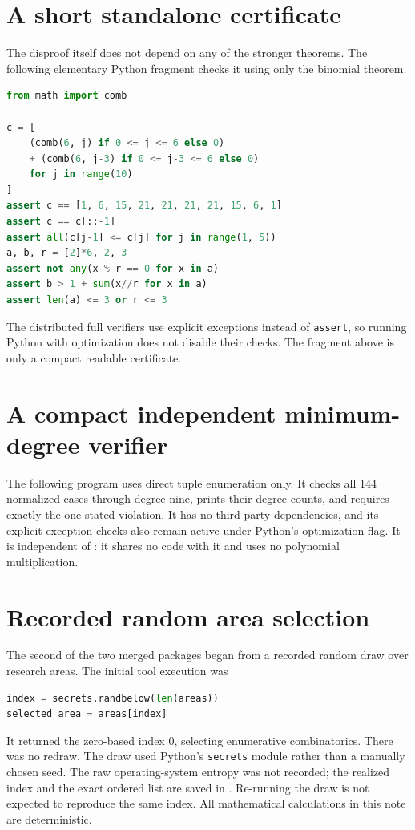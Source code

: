 \documentclass[11pt]{article}
\theoremstyle{research}
\theoremstyle{definition}
\numberwithin{equation}{section}
\begin{document}
\section{A short standalone certificate}
\label{app:short-certificate}
The disproof itself does not depend on any of the stronger theorems.
The following elementary Python fragment checks it using only the
binomial theorem.
\begin{lstlisting}[language=Python]
from math import comb

c = [
    (comb(6, j) if 0 <= j <= 6 else 0)
    + (comb(6, j-3) if 0 <= j-3 <= 6 else 0)
    for j in range(10)
]
assert c == [1, 6, 15, 21, 21, 21, 21, 15, 6, 1]
assert c == c[::-1]
assert all(c[j-1] <= c[j] for j in range(1, 5))
a, b, r = [2]*6, 2, 3
assert not any(x % r == 0 for x in a)
assert b > 1 + sum(x//r for x in a)
assert len(a) <= 3 or r <= 3
\end{lstlisting}
The distributed full verifiers use explicit exceptions instead of
\texttt{assert}, so running Python with optimization does not disable their
checks. The fragment above is only a compact readable certificate.

\section{A compact independent minimum-degree verifier}
\label{app:minimal-code}
The following program uses direct tuple enumeration only. It checks all
144 normalized cases through degree nine, prints their degree counts, and
requires exactly the one stated violation. It has no third-party
dependencies, and its explicit exception checks also remain active under
Python's optimization flag. It is independent of
: it shares no code with it and uses no
polynomial multiplication.



\section{Recorded random area selection}
\label{app:random}
The second of the two merged packages began from a recorded random draw
over research areas. The initial tool execution was
\begin{lstlisting}[language=Python]
index = secrets.randbelow(len(areas))
selected_area = areas[index]
\end{lstlisting}
It returned the zero-based index $0$, selecting enumerative combinatorics.
There was no redraw. The draw used Python's \texttt{secrets} module rather
than a manually chosen seed. The raw operating-system entropy was not
recorded; the realized index and the exact ordered list are saved in
. Re-running the draw is not expected to
reproduce the same index. All mathematical calculations in this note are
deterministic.
\end{document}
